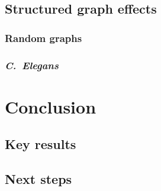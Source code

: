 \documentclass[openacc]{class/rsprocb_new}
\begin{document}
\subsection{Structured graph effects}
\subsubsection{Random graphs}
\subsubsection{\emph{C.\ Elegans}}

\section{Conclusion}
\subsection{Key results}
\subsection{Next steps}




\end{document}
